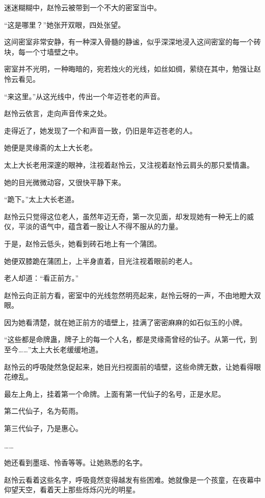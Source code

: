 
\begin{this_body}



迷迷糊糊中，赵怜云被带到一个不大的密室当中。

“这是哪里？”她张开双眼，四处张望。

这间密室非常安静，有一种深入骨髓的静谧，似乎深深地浸入这间密室的每一个砖块，每一个寸墙壁之中。

密室并不光明，一种晦暗的，宛若烛火的光线，如丝如绸，萦绕在其中，勉强让赵怜云看见。

“来这里。”从这光线中，传出一个年迈苍老的声音。

赵怜云依言，走向声音传来之处。

走得近了，她发现了一个和声音一致，仍旧是年迈苍老的人。

她便是灵缘斋的太上大长老。

太上大长老用深邃的眼神，注视着赵怜云，又注视着赵怜云肩头的那只爱情蛊。

她的目光微微动容，又很快平静下来。

“跪下。”太上大长老道。

赵怜云只觉得这位老人，虽然年迈无奇，第一次见面，却发现她有一种无上的威仪，平淡的语气中，蕴含着一股让人不得不服从的力量。

于是，赵怜云低头，她看到砖石地上有一个蒲团。

她便双膝跪在蒲团上，上半身直着，目光注视着眼前的老人。

老人却道：“看正前方。”

赵怜云向正前方看，密室中的光线忽然明亮起来，赵怜云呀的一声，不由地瞪大双眼。

因为她看清楚，就在她正前方的墙壁上，挂满了密密麻麻的如石似玉的小牌。

“这些都是命牌蛊，牌子上的每一个人名，都是灵缘斋曾经的仙子。从第一代，到至今……”太上大长老缓缓地道。

赵怜云的呼吸陡然急促起来，她目光扫视面前的墙壁，这些命牌无数，让她看得眼花缭乱。

最左上角上，挂着第一个命牌。上面有第一代仙子的名号，正是水尼。

第二代仙子，名为荀雨。

第三代仙子，乃是惠心。

……

她还看到墨瑶、怜香等等。让她熟悉的名字。

赵怜云看着这些名字，呼吸竟然变得越发有些困难。她就像是一个孩童，在夜幕中仰望天空，看着天上那些烁烁闪光的明星。


\end{this_body}
